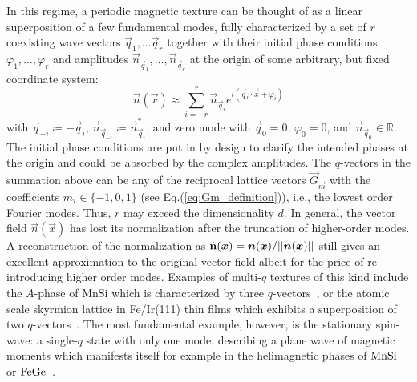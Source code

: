 \documentclass[submission, Phys]{SciPost}
\begin{document}
In this regime, a periodic magnetic texture can be thought of as a linear superposition of a few fundamental modes, fully characterized by a set of $r$ coexisting wave vectors $\vec{q}_1, \ldots \vec{q}_r$ together with their initial phase conditions $\varphi_1, \ldots, \varphi_r$ and amplitudes $\vec{n}_{\vec{q}_{1}},\ldots, \vec{n}_{\vec{q}_{r}}$ at the origin of some arbitrary, but fixed coordinate system:
\begin{equation}
    \vec{n}(\vec{x})\approx \sum_{i=-r}^r  \vec{n}_{\vec{q}_{i}}e^{i(\vec{q}_i\cdot\vec{x}+\varphi_{i})}
    \label{eq:fourier_modes}
\end{equation}
with $\vec{q}_{-i}\coloneqq -\vec{q}_i$, $\vec{n}_{\vec{q}_{-i}}\coloneqq\vec{n}_{\vec{q}_{i}}^\ast$, and zero mode with $\vec{q}_0=0$, $\varphi_0=0$, and $\vec{n}_{\vec{q}_0}\in\mathbb{R}$.
The initial phase conditions are put in by design to clarify the intended phases at the origin and could be absorbed by the complex amplitudes.
The $q$-vectors in the summation above can be any of the reciprocal lattice vectors $\vec{G}_{\vec{m}}$ with the coefficients $m_i \in \lbrace -1,0,1\rbrace$ (see Eq.(\ref{eq:Gm_definition})), i.e., the lowest order Fourier modes.
Thus, $r$ may exceed the dimensionality $d$.
In general, the vector field $\vec{n}(\vec{x})$ has lost its normalization after the truncation of higher-order modes. 
A reconstruction of the normalization as $\hat{\mathbf{n}}(\boldsymbol{x})=\boldsymbol{n}(\boldsymbol{x})/||\boldsymbol{n}(\boldsymbol{x})||$ still gives an excellent approximation to the original vector field  albeit for the price of re-introducing higher order modes.
Examples of multi-$q$ textures of this kind include the $A$-phase of MnSi which is characterized by three $q$-vectors~\cite{Neubauer2009}, or the atomic scale skyrmion lattice in Fe/Ir(111) thin films which exhibits a superposition of two $q$-vectors~\cite{Heinze2011}.
The most fundamental example, however, is the stationary spin-wave: a single-$q$ state with only one mode, describing a plane wave of magnetic moments which manifests itself for example in the helimagnetic phases of $\ce{MnSi}$~\cite{Ishikawa1976, Hansen1977,Plumer1981, Bauer2017} or $\ce{FeGe}$~\cite{Ludgren1970,Lebech1989}.
\end{document}
